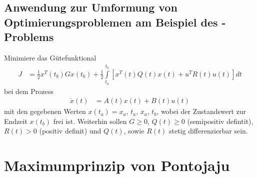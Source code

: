\subsection{Anwendung zur Umformung von Optimierungsproblemen am Beispiel des -Problems}
Minimiere das Gütefunktional
\begin{align*}
	J  & = \frac12 x^T(t_b)Gx(t_b)+\frac12\int\limits_{t_a}^{t_b}\left[x^T(t)Q(t)x(t)+u^TR(t)u(t)\right]dt
\end{align*}
bei dem Prozess 
\begin{align*}
	\dot{x}(t) & = A(t)x(t)+B(t)u(t)
\end{align*}
mit den gegebenen Werten $x(t_a)=x_a$, $t_a$, $x_a$, $t_b$, wobei der Zustandswert zur Endzeit $x(t_b)$ frei ist. Weiterhin sollen $G\ge 0$, $Q(t)\ge 0$ (semipositiv defintit), $R(t)>0$
(positiv definit) und $Q(t)$, sowie $R(t)$ stetig differenzierbar sein.

\section{Maximumprinzip von Pontojaju}
